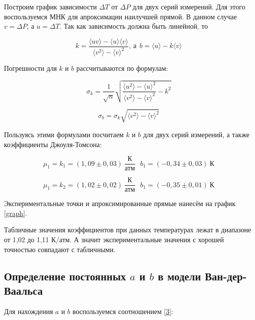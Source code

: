 \documentclass[a4paper,12pt]{article}
\begin{document}
Построим график зависимости $\Delta T$ от $\Delta P$ для двух серий измерений. Для этого воспользуемся МНК для апроксимации наилучшей прямой. В данном случае $v = \Delta P$, а $u = \Delta T$. Так как зависимость должна быть линейной, то

\begin{equation}
    k = \frac{\langle uv\rangle - \langle u \rangle \langle v \rangle}{\langle v^2 \rangle - \langle v \rangle^2},
    \ \text{а} \ \  b = \langle u \rangle - k\langle v \rangle
\end{equation}

Погрешности для $k$ и $b$ рассчитываются по формулам:

\begin{equation}
    \sigma_k = \frac{1}{\sqrt{n}} \sqrt{\frac{\langle u^2 \rangle - \langle u \rangle^2}{\langle v^2 \rangle - \langle v \rangle^2} - k^2}
\end{equation}

\begin{equation}
    \sigma_b = \sigma_k\sqrt{\langle v^2 \rangle - \langle v \rangle^2}
\end{equation}

Пользуясь этими формулами посчитаем $k$ и $b$ для двух серий измерений, а также коэффициенты Джоуля-Томсона:

\begin{equation}
    \mu_1 = k_1 = (1,09 \pm 0,03) \ \frac{\text{К}}{\text{атм}} \ \ \ b_1 = (-0,34 \pm 0,03) \ \text{К}
\end{equation}

\begin{equation}
    \mu_1 = k_2 = (1,02 \pm 0,02) \ \frac{\text{К}}{\text{атм}} \ \ \ b_1 = (-0,35 \pm 0,01) \ \text{К}
\end{equation}

Экспериментальные точки и апроксимированные прямые нанесём на график \ref{graph}.

Табличные значения коэффициентов при данных температурах лежат в диапазоне от 1,02 до 1,11 К/атм. А значит экспериментальные значения с хорошей точностью совпадают с табличными.


\subsection{Определение постоянных $a$ и $b$ в модели Ван-дер-Ваальса}

Для нахождения $a$ и $b$ воспользуемся соотношением \eqref{3}:
\end{document}
